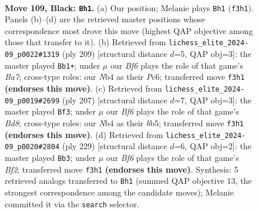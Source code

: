 \documentclass[11pt]{article}
\begin{document}
\clearpage

\begin{figure}[p]\centering
\begin{subfigure}{0.46\textwidth}\centering
\resizebox{\linewidth}{!}{%
\newchessgame
\chessboard[
  setfen={8/8/8/8/1n1B3k/5b2/5P2/5K2 b - - 64 109},
  showmover=false,
  pgfstyle=straightmove, color=movearrow, markmove={f3-h1}
]}
\caption{}
\end{subfigure}\hfill
\begin{subfigure}{0.46\textwidth}\centering
\resizebox{\linewidth}{!}{%
\newchessgame
\chessboard[
  setfen={4k3/8/2p2PK1/2P5/8/2B5/b7/8 b - - 20 105},
  showmover=false,
  pgfstyle=straightmove, color=movearrow, markmove={a2-b1}
]}
\caption{}
\end{subfigure}
\\[4pt]
\begin{subfigure}{0.46\textwidth}\centering
\resizebox{\linewidth}{!}{%
\newchessgame
\chessboard[
  setfen={8/8/8/1B6/3k4/P7/1K6/3b4 b - - 30 104},
  showmover=false,
  pgfstyle=straightmove, color=movearrow, markmove={d1-f3}
]}
\caption{}
\end{subfigure}\hfill
\begin{subfigure}{0.46\textwidth}\centering
\resizebox{\linewidth}{!}{%
\newchessgame
\chessboard[
  setfen={8/3K1b2/5P2/8/5k2/2B5/8/8 b - - 44 115},
  showmover=false,
  pgfstyle=straightmove, color=movearrow, markmove={f7-b3}
]}
\caption{}
\end{subfigure}
\caption{\textbf{Move 109, Black: \texttt{Bh1}.} (a) Our position; Melanie plays \texttt{Bh1} (\texttt{f3h1}). Panels (b)--(d) are the retrieved master positions whose correspondence most drove this move (highest QAP objective among those that transfer to it). (b) Retrieved from \texttt{lichess\_elite\_2024-09\_p0022\#1319} (ply 209) [structural distance $d$=5, QAP obj=3]: the master played \texttt{Bb1+}; under $\mu$ our \emph{Bf6} plays the role of that game's \emph{Ba7}; cross-type roles: our \emph{N}b4 as their \emph{P}c6; transferred move \texttt{f3h1} \textbf{(endorses this move)}. (c) Retrieved from \texttt{lichess\_elite\_2024-09\_p0019\#2699} (ply 207) [structural distance $d$=7, QAP obj=3]: the master played \texttt{Bf3}; under $\mu$ our \emph{Bf6} plays the role of that game's \emph{Bd8}; cross-type roles: our \emph{N}b4 as their \emph{b}b5; transferred move \texttt{f3h1} \textbf{(endorses this move)}. (d) Retrieved from \texttt{lichess\_elite\_2024-09\_p0020\#2804} (ply 229) [structural distance $d$=6, QAP obj=2]: the master played \texttt{Bb3}; under $\mu$ our \emph{Bf6} plays the role of that game's \emph{Bf2}; transferred move \texttt{f3h1} \textbf{(endorses this move)}. Synthesis: 5 retrieved analogs transferred to \texttt{Bh1} (summed QAP objective 13, the strongest correspondence among the candidate moves); Melanie committed it via the \texttt{search} selector.}
\label{fig:thought-m217}
\end{figure}
\end{document}
